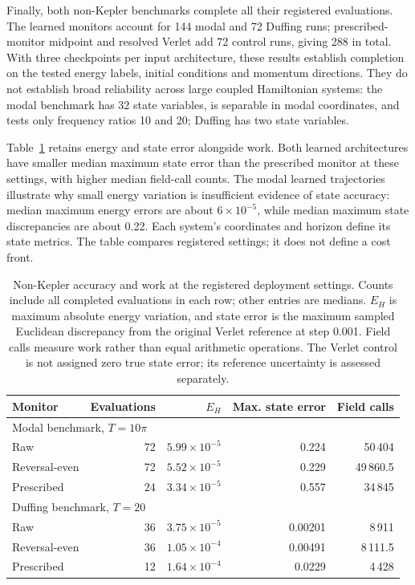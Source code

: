 \documentclass[final,3p,times]{elsarticle}
\begin{document}
Finally, both non-Kepler benchmarks complete all their registered
evaluations. The learned monitors account for 144 modal and 72 Duffing
runs; prescribed-monitor midpoint and resolved Verlet add 72 control
runs, giving 288 in total. With three checkpoints per input architecture,
these results establish completion on the tested energy labels, initial
conditions and momentum directions. They do not establish broad
reliability across large coupled Hamiltonian systems: the modal benchmark
has 32 state variables, is separable in modal coordinates, and tests only
frequency ratios 10 and 20; Duffing has two state variables.

Table~\ref{tab:cross-system-accuracy} retains energy and state error
alongside work. Both learned architectures have smaller median maximum
state error than the prescribed monitor at these settings, with higher
median field-call counts. The modal learned trajectories illustrate why
small energy variation is insufficient evidence of state accuracy:
median maximum energy errors are about $6\times10^{-5}$, while median
maximum state discrepancies are about 0.22. Each system's coordinates and horizon define its state metrics.
The table compares registered settings; it does not define a cost front.

\begin{table}[t]
\centering
\caption{Non-Kepler accuracy and work at the registered deployment
settings. Counts include all completed evaluations in each row; other
entries are medians. $E_H$ is maximum absolute energy variation, and
state error is the maximum sampled Euclidean discrepancy from the
original Verlet reference at step 0.001. Field calls measure work rather
than equal arithmetic operations. The Verlet control is not assigned
zero true state error; its reference uncertainty is assessed separately.}
\label{tab:cross-system-accuracy}
\begingroup
\renewcommand{\baselinestretch}{1}\small
\setlength{\tabcolsep}{5pt}
\begin{tabular}{lrrrr}
\toprule
Monitor & Evaluations & $E_H$ & Max. state error & Field calls \\
\midrule
\multicolumn{5}{l}{Modal benchmark, $T=10\pi$} \\
Raw & 72 & $5.99\times10^{-5}$ & 0.224 & 50\,404 \\
Reversal-even & 72 & $5.52\times10^{-5}$ & 0.229 & 49\,860.5 \\
Prescribed & 24 & $3.34\times10^{-5}$ & 0.557 & 34\,845 \\
\midrule
\multicolumn{5}{l}{Duffing benchmark, $T=20$} \\
Raw & 36 & $3.75\times10^{-5}$ & 0.00201 & 8\,911 \\
Reversal-even & 36 & $1.05\times10^{-4}$ & 0.00491 & 8\,111.5 \\
Prescribed & 12 & $1.64\times10^{-4}$ & 0.0229 & 4\,428 \\
\bottomrule
\end{tabular}
\endgroup
\end{table}
\end{document}
